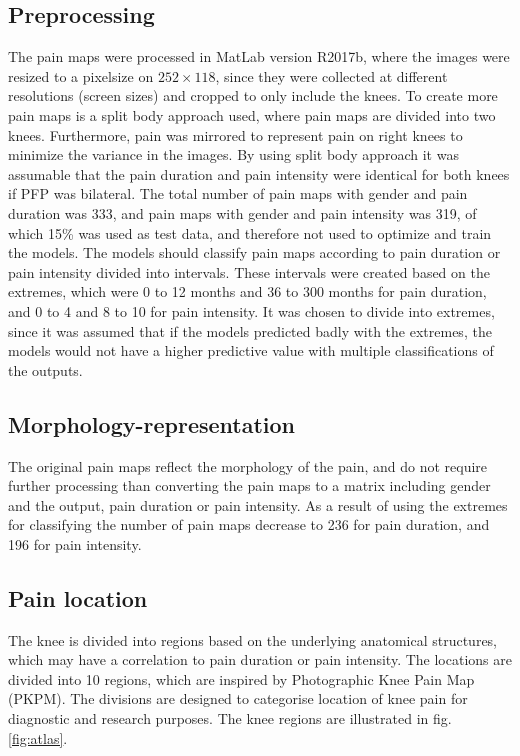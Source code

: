 \subsection*{\textbf{Preprocessing}}
\noindent
The pain maps were processed in MatLab version R2017b, where the images were resized to a pixelsize on $252 \times 118$, since they were collected at different resolutions (screen sizes) and cropped to only include the knees. To create more pain maps is a split body approach used, where pain maps are divided into two knees. Furthermore, pain was mirrored to represent pain on right knees to minimize the variance in the images. By using split body approach it was assumable that the pain duration and pain intensity were identical for both knees if PFP was bilateral. The total number of pain maps with gender and pain duration was 333, and pain maps with gender and pain intensity was 319, of which 15\% was used as test data, and therefore not used to optimize and train the models. \newline
\noindent
The models should classify pain maps according to pain duration or pain intensity divided into intervals. These intervals were created based on the extremes, which were 0 to 12 months and 36 to 300 months for pain duration, and 0 to 4 and 8 to 10 for pain intensity. It was chosen to divide into extremes, since it was assumed that
if the models predicted badly with the extremes, the models would not have a higher predictive value with multiple classifications of the outputs.

\subsection*{\textbf{Morphology-representation}}
\noindent
The original pain maps reflect the morphology of the pain, and do not require further processing than converting the pain maps to a matrix including gender and the output, pain duration or pain intensity. As a result of using the extremes for classifying the number of pain maps decrease to 236 for pain duration, and 196 for pain intensity.


\subsection*{\textbf{Pain location}} 
\noindent
The knee is divided into regions based on the underlying anatomical structures, which may have a correlation to pain duration or pain intensity.
The locations are divided into 10 regions, which are inspired by Photographic Knee Pain Map (PKPM). The divisions are designed to categorise location of knee pain for diagnostic and research purposes.\citep{Elson2010} The knee regions are illustrated in fig. \ref{fig:atlas}.


